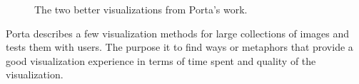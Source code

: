 \begin{figure}[!htb]
  \begin{subfigmatrix}{2}
  \end{subfigmatrix}
  \caption{The two better visualizations from Porta's work.}
  \label{fig:porta}
\end{figure}


Porta \cite{Porta:2006p416} describes a few visualization methods for large collections of images and tests them with users. The purpose it to find ways or metaphors that provide a good visualization experience in terms of time spent and quality of the visualization.


